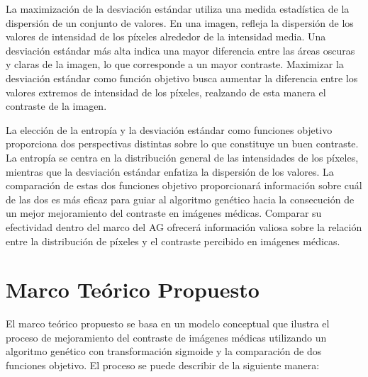 La maximización de la desviación estándar utiliza una medida estadística de la dispersión de un conjunto de valores. En una imagen, refleja la dispersión de los valores de intensidad de los píxeles alrededor de la intensidad media. Una desviación estándar más alta indica una mayor diferencia entre las áreas oscuras y claras de la imagen, lo que corresponde a un mayor contraste. Maximizar la desviación estándar como función objetivo busca aumentar la diferencia entre los valores extremos de intensidad de los píxeles, realzando de esta manera el contraste de la imagen.

La elección de la entropía y la desviación estándar como funciones objetivo proporciona dos perspectivas distintas sobre lo que constituye un buen contraste. La entropía se centra en la distribución general de las intensidades de los píxeles, mientras que la desviación estándar enfatiza la dispersión de los valores. La comparación de estas dos funciones objetivo proporcionará información sobre cuál de las dos es más eficaz para guiar al algoritmo genético hacia la consecución de un mejor mejoramiento del contraste en imágenes médicas. Comparar su efectividad dentro del marco del AG ofrecerá información valiosa sobre la relación entre la distribución de píxeles y el contraste percibido en imágenes médicas.

\section{Marco Teórico Propuesto}
El marco teórico propuesto se basa en un modelo conceptual que ilustra el proceso de mejoramiento del contraste de imágenes médicas utilizando un algoritmo genético con transformación sigmoide y la comparación de dos funciones objetivo. El proceso se puede describir de la siguiente manera:

